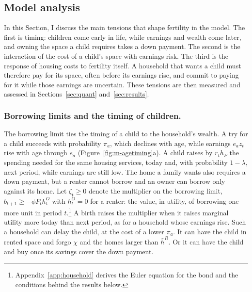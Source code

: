 \subsection{Model analysis}
\label{sec:m-analysis}

In this Section, I discuss the main tensions that shape fertility in the
model. The first is timing: children come early in life, while earnings and
wealth come later, and owning the space a child requires takes a down
payment. The second is the interaction of the cost of a child's space with
earnings risk. The third is the response of housing costs to fertility
itself. A household that wants a child must therefore pay for its
space, often before its earnings rise, and commit to paying for it while
those earnings are uncertain. These tensions are then measured and assessed
in Sections~\ref{sec:quant} and~\ref{sec:results}.

\subsubsection*{Borrowing limits and the timing of children.}
The borrowing limit ties the timing of a child to the household's wealth. A
try for a child succeeds with probability $\pi_a$, which declines with age,
while earnings $e_az_t$ rise with age through $e_a$
(Figure~\ref{fig:m-agetiming}a). A child raises by $r_th_P$ the spending
needed for the same housing services, today and, with probability
$1-\lambda$, next period, while earnings are still low. The home a family
wants also requires a down payment, but a renter cannot borrow and an owner
can borrow only against its home. Let $\zeta_t\ge0$ denote the multiplier on
the borrowing limit, $b_{t+1}\ge-\phi P_th^O_t$ with $h^O_t=0$ for a renter:
the value, in utility, of borrowing one more unit in period
$t$.\footnote{Appendix~\ref{app:household} derives the Euler equation for the
bond and the conditions behind the results below.} A birth raises the
multiplier when it raises marginal utility more today than next period, as
for a household whose earnings rise. Such a household can delay the child, at
the cost of a lower $\pi_a$. It can have the child in rented space and forgo
$\chi$ and the homes larger than $\bar h^R$. Or it can have the child and buy
once its savings cover the down payment.

